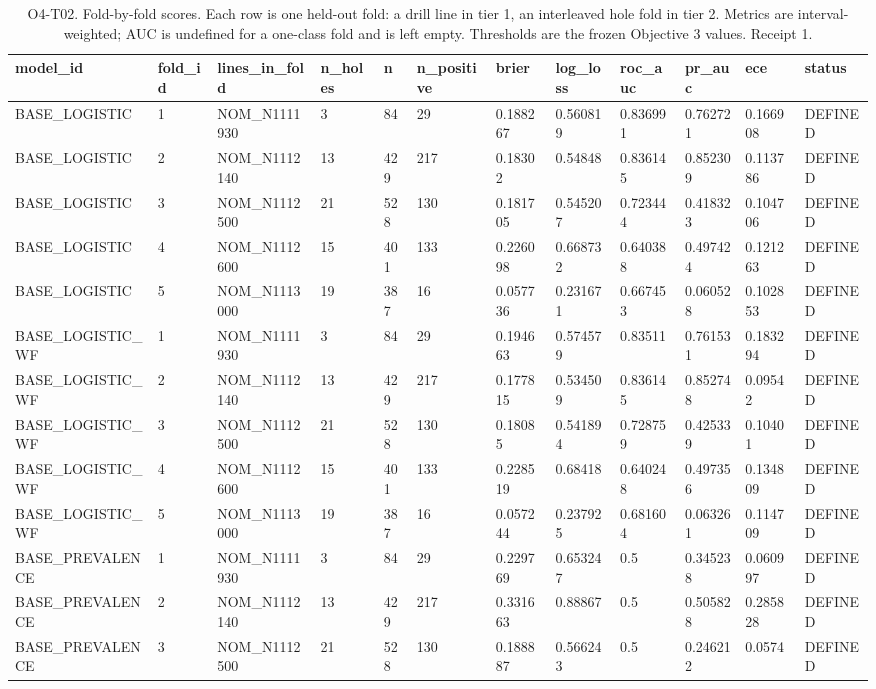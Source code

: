 \begin{table}[ht]
\centering
\scriptsize
\caption{O4-T02. Fold-by-fold scores. Each row is one held-out fold: a drill line in tier 1, an interleaved hole fold in tier 2. Metrics are interval-weighted; AUC is undefined for a one-class fold and is left empty. Thresholds are the frozen Objective 3 values. Receipt 1.}
\label{tab:O4-T02}
\begin{tabular}{llllllllllll}
\toprule
model\_id & fold\_id & lines\_in\_fold & n\_holes & n & n\_positive & brier & log\_loss & roc\_auc & pr\_auc & ece & status \\
\midrule
BASE\_LOGISTIC & 1 & NOM\_N1111930 & 3 & 84 & 29 & 0.188267 & 0.560819 & 0.836991 & 0.762721 & 0.166908 & DEFINED \\
BASE\_LOGISTIC & 2 & NOM\_N1112140 & 13 & 429 & 217 & 0.18302 & 0.54848 & 0.836145 & 0.852309 & 0.113786 & DEFINED \\
BASE\_LOGISTIC & 3 & NOM\_N1112500 & 21 & 528 & 130 & 0.181705 & 0.545207 & 0.723444 & 0.418323 & 0.104706 & DEFINED \\
BASE\_LOGISTIC & 4 & NOM\_N1112600 & 15 & 401 & 133 & 0.226098 & 0.668732 & 0.640388 & 0.497424 & 0.121263 & DEFINED \\
BASE\_LOGISTIC & 5 & NOM\_N1113000 & 19 & 387 & 16 & 0.057736 & 0.231671 & 0.667453 & 0.060528 & 0.102853 & DEFINED \\
BASE\_LOGISTIC\_WF & 1 & NOM\_N1111930 & 3 & 84 & 29 & 0.194663 & 0.574579 & 0.83511 & 0.761531 & 0.183294 & DEFINED \\
BASE\_LOGISTIC\_WF & 2 & NOM\_N1112140 & 13 & 429 & 217 & 0.177815 & 0.534509 & 0.836145 & 0.852748 & 0.09542 & DEFINED \\
BASE\_LOGISTIC\_WF & 3 & NOM\_N1112500 & 21 & 528 & 130 & 0.18085 & 0.541894 & 0.728759 & 0.425339 & 0.10401 & DEFINED \\
BASE\_LOGISTIC\_WF & 4 & NOM\_N1112600 & 15 & 401 & 133 & 0.228519 & 0.68418 & 0.640248 & 0.497356 & 0.134809 & DEFINED \\
BASE\_LOGISTIC\_WF & 5 & NOM\_N1113000 & 19 & 387 & 16 & 0.057244 & 0.237925 & 0.681604 & 0.063261 & 0.114709 & DEFINED \\
BASE\_PREVALENCE & 1 & NOM\_N1111930 & 3 & 84 & 29 & 0.229769 & 0.653247 & 0.5 & 0.345238 & 0.060997 & DEFINED \\
BASE\_PREVALENCE & 2 & NOM\_N1112140 & 13 & 429 & 217 & 0.331663 & 0.88867 & 0.5 & 0.505828 & 0.285828 & DEFINED \\
BASE\_PREVALENCE & 3 & NOM\_N1112500 & 21 & 528 & 130 & 0.188887 & 0.566243 & 0.5 & 0.246212 & 0.0574 & DEFINED \\

\end{tabular}
\end{table}
